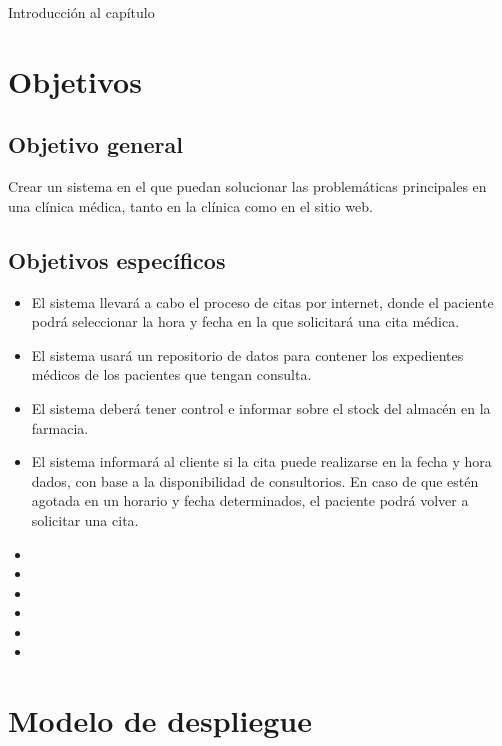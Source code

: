 Introducción al capítulo

\section{Objetivos}

\subsection{Objetivo general}
Crear un sistema en el que puedan solucionar las problem\'aticas principales en una cl\'inica m\'edica, tanto en
la cl\'inica como en el sitio web.
\subsection{Objetivos específicos}
\begin{itemize}
\item El sistema llevar\'a a cabo el proceso de citas por internet, donde el paciente podr\'a seleccionar la hora y fecha en la que solicitar\'a una cita m\'edica.
\item El sistema usar\'a un repositorio de datos para contener los expedientes m\'edicos de los pacientes que tengan consulta.
\item El sistema deber\'a tener control e informar sobre el stock del almac\'en en la farmacia.
\item El sistema informar\'a al cliente si la cita puede realizarse en la fecha y hora dados, con base a la disponibilidad de consultorios. En
caso de que est\'en agotada en un horario y fecha determinados, el paciente podr\'a volver a solicitar una cita.
\item 
\item 
\item 
\item 
\item 
\item 
\end{itemize}
\hspace{-.50cm}
\hspace{-.50cm}
\section{Modelo de despliegue}


